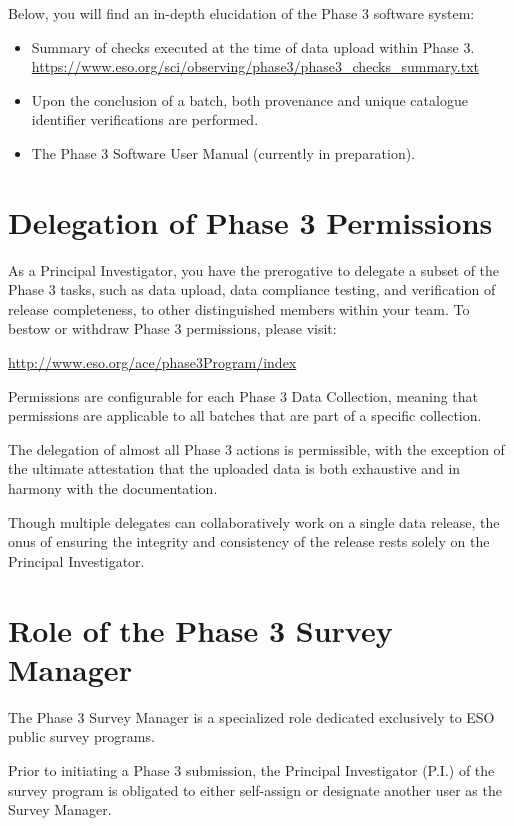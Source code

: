 \documentclass[a4paper,10pt]{book}
\begin{document}
Below, you will find an in-depth elucidation of the Phase 3 software system:

\begin{itemize}
    \item Summary of checks executed at the time of data upload within Phase 3. \url{https://www.eso.org/sci/observing/phase3/phase3_checks_summary.txt}
    \item Upon the conclusion of a batch, both provenance and unique catalogue identifier verifications are performed.
    \item The Phase 3 Software User Manual (currently in preparation).
\end{itemize}

\section{Delegation of Phase 3 Permissions}

As a Principal Investigator, you have the prerogative to delegate a subset of the Phase 3 tasks, such as data upload, data compliance testing, and verification of release completeness, to other distinguished members within your team. To bestow or withdraw Phase 3 permissions, please visit:

\url{http://www.eso.org/ace/phase3Program/index}

Permissions are configurable for each Phase 3 Data Collection, meaning that permissions are applicable to all batches that are part of a specific collection.

The delegation of almost all Phase 3 actions is permissible, with the exception of the ultimate attestation that the uploaded data is both exhaustive and in harmony with the documentation.

Though multiple delegates can collaboratively work on a single data release, the onus of ensuring the integrity and consistency of the release rests solely on the Principal Investigator.

\section{Role of the Phase 3 Survey Manager}

The Phase 3 Survey Manager is a specialized role dedicated exclusively to ESO public survey programs.

Prior to initiating a Phase 3 submission, the Principal Investigator (P.I.) of the survey program is obligated to either self-assign or designate another user as the Survey Manager.
\end{document}
